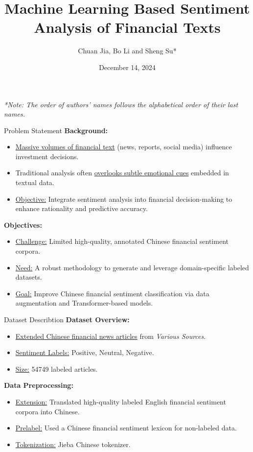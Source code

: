 \documentclass[aspectratio=169]{beamer}
\title[ML Sentiment Analysis for Finance]{Machine Learning Based Sentiment Analysis of Financial Texts}
\author[C.J., B.L. and S.S.]{Chuan Jia, Bo Li and Sheng Su*}
\institute[M.U.S.T.]{Macau University of Science and Technology}
\date{December 14, 2024}
\begin{document}
\begin{frame}
    \titlepage
    \vspace{0.4cm} %
    \footnotesize{\textit{*Note: The order of authors' names follows the alphabetical order of their last names.}}
\end{frame}

\begin{frame}{Problem Statement}
\textbf{Background:}
\begin{itemize}
  \item \underline{Massive volumes of financial text} (news, reports, social media) influence investment decisions.
  \item Traditional analysis often \underline{overlooks subtle emotional cues} embedded in textual data.
  \item \underline{Objective:} Integrate sentiment analysis into financial decision-making to enhance rationality and predictive accuracy.
\end{itemize}

\textbf{Objectives:}
\begin{itemize}
  \item \underline{Challenge:} Limited high-quality, annotated Chinese financial sentiment corpora.
  \item \underline{Need:} A robust methodology to generate and leverage domain-specific labeled datasets.
  \item \underline{Goal:} Improve Chinese financial sentiment classification via data augmentation and Transformer-based models.
\end{itemize}
\end{frame}

\begin{frame}{Dataset Describtion}
  \textbf{Dataset Overview:}
  \begin{itemize}
    \item \underline{Extended Chinese financial news articles} from \textit{Various Sources}.
    \item \underline{Sentiment Labels:} Positive, Neutral, Negative.
    \item \underline{Size:} 54749 labeled articles.
  \end{itemize}
  
  \textbf{Data Preprocessing:}
  \begin{itemize}
    \item \underline{Extension:} Translated high-quality labeled English financial sentiment corpora into Chinese.
    \item \underline{Prelabel:} Used a Chinese financial sentiment lexicon for non-labeled data.
    \item \underline{Tokenization:} Jieba Chinese tokenizer.
  \end{itemize}
\end{frame}
\end{document}
